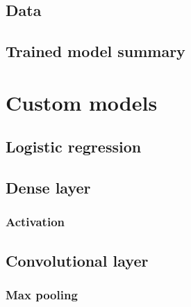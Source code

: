 \documentclass[article,nojss]{jss}
\begin{document}
\hypertarget{data}{%
\subsection{Data}\label{data}}

\lipsum[2]

\hypertarget{trained-model-summary}{%
\subsection{Trained model summary}\label{trained-model-summary}}

\lipsum[2]

\hypertarget{custom-models}{%
\section{Custom models}\label{custom-models}}

\lipsum[2]

\hypertarget{logistic-regression}{%
\subsection{Logistic regression}\label{logistic-regression}}

\lipsum[2]

\hypertarget{dense-layer}{%
\subsection{Dense layer}\label{dense-layer}}

\lipsum[2]

\hypertarget{activation}{%
\subsubsection{Activation}\label{activation}}

\lipsum[2]

\hypertarget{convolutional-layer}{%
\subsection{Convolutional layer}\label{convolutional-layer}}

\lipsum[2]

\hypertarget{max-pooling}{%
\subsubsection{Max pooling}\label{max-pooling}}
\end{document}
